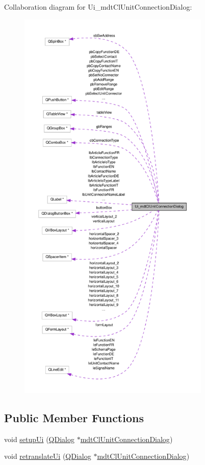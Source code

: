Collaboration diagram for Ui\-\_\-mdt\-Cl\-Unit\-Connection\-Dialog\-:
\nopagebreak
\begin{figure}[H]
\begin{center}
\leavevmode
\includegraphics[height=550pt]{class_ui__mdt_cl_unit_connection_dialog__coll__graph}
\end{center}
\end{figure}
\subsection*{Public Member Functions}
\begin{DoxyCompactItemize}
\item 
void \hyperlink{class_ui__mdt_cl_unit_connection_dialog_ab03eca441063083c64115ba2c708fcfe}{setup\-Ui} (\hyperlink{class_q_dialog}{Q\-Dialog} $\ast$\hyperlink{classmdt_cl_unit_connection_dialog}{mdt\-Cl\-Unit\-Connection\-Dialog})
\item 
void \hyperlink{class_ui__mdt_cl_unit_connection_dialog_af201d521d3b616a316a4ba4e402eb838}{retranslate\-Ui} (\hyperlink{class_q_dialog}{Q\-Dialog} $\ast$\hyperlink{classmdt_cl_unit_connection_dialog}{mdt\-Cl\-Unit\-Connection\-Dialog})
\end{DoxyCompactItemize}
